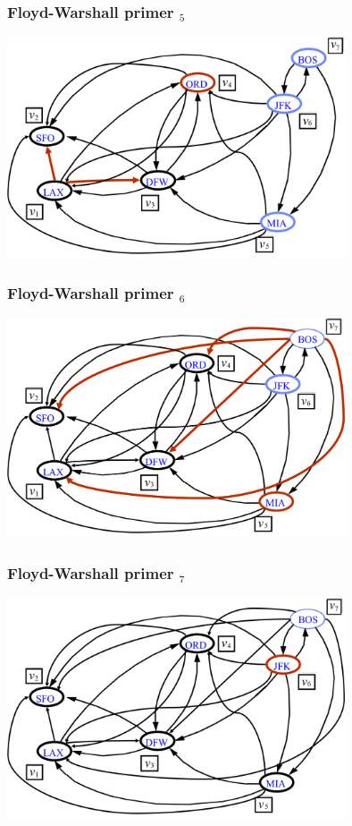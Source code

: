 \documentclass[compress]{beamer}
\begin{document}
\begin{frame}[fragile]
  \frametitle{Floyd-Warshall primer $_5$}
  \begin{center}
    \includegraphics[width=10cm]{asp-14-pic41.png}
  \end{center}
\end{frame}

\begin{frame}[fragile]
  \frametitle{Floyd-Warshall primer $_6$}
  \begin{center}
    \includegraphics[width=10cm]{asp-14-pic42.png}
  \end{center}
\end{frame}

\begin{frame}[fragile]
  \frametitle{Floyd-Warshall primer $_7$}
  \begin{center}
    \includegraphics[width=10cm]{asp-14-pic43.png}
  \end{center}
\end{frame}
\end{document}
